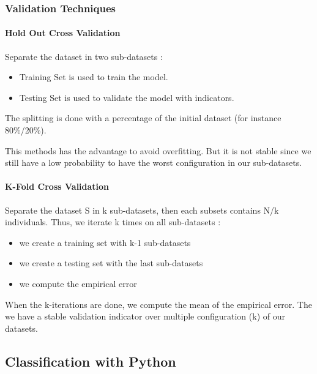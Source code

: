 \documentclass[11pt]{article}
\providecommand{\tightlist}{%
      \setlength{\itemsep}{0pt}\setlength{\parskip}{0pt}}
\begin{document}
    \hypertarget{validation-techniques}{%
\subsubsection{Validation Techniques}\label{validation-techniques}}

    \hypertarget{hold-out-cross-validation}{%
\paragraph{Hold Out Cross Validation}\label{hold-out-cross-validation}}

Separate the dataset in two sub-datasets :

\begin{itemize}
\tightlist
\item
  Training Set is used to train the model.
\item
  Testing Set is used to validate the model with indicators.
\end{itemize}

The splitting is done with a percentage of the initial dataset (for
instance 80\%/20\%).

This methods has the advantage to avoid overfitting. But it is not
stable since we still have a low probability to have the worst
configuration in our sub-datasets.

    \hypertarget{k-fold-cross-validation}{%
\paragraph{K-Fold Cross Validation}\label{k-fold-cross-validation}}

Separate the dataset S in k sub-datasets, then each subsets contains N/k
individuals. Thus, we iterate k times on all sub-datasets :

\begin{itemize}
\tightlist
\item
  we create a training set with k-1 sub-datasets
\item
  we create a testing set with the last sub-datasets
\item
  we compute the empirical error
\end{itemize}

When the k-iterations are done, we compute the mean of the empirical
error. The we have a stable validation indicator over multiple
configuration (k) of our datasets.

    \hypertarget{classification-with-python}{%
\subsection{Classification with
Python}\label{classification-with-python}}
\end{document}

